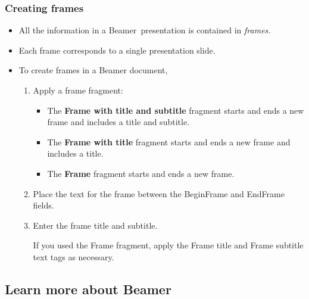\documentclass[notes=show]{beamer}%
\newenvironment{stepenumerate}{\begin{enumerate}[<+->]}{\end{enumerate}}
\newenvironment{stepitemize}{\begin{itemize}[<+->]}{\end{itemize} }
\begin{document}
\begin{frame}%
%

\frametitle{Creating frames}%


\begin{stepitemize}
\item All the information in a Beamer\emph{\ }presentation is contained in
\textit{frames.}

\item Each frame corresponds to a single presentation slide.

\item To create frames in a Beamer document,

\begin{stepenumerate}
\item Apply a frame fragment:

\begin{stepitemize}
\item The \textbf{Frame with title and subtitle} fragment starts and ends a
new frame and includes a title and subtitle.

\item The \textbf{Frame with title }fragment starts and ends a new frame and
includes a title.

\item The \textbf{Frame} fragment starts and ends a new frame.
\end{stepitemize}

\item Place the text for the frame between the BeginFrame and EndFrame fields.

\item Enter the frame title and subtitle.

If you used the Frame fragment, apply the Frame title and Frame subtitle text
tags as necessary.
\end{stepenumerate}
\end{stepitemize}%

\end{frame}%


\subsection{Learn more about Beamer}%
\end{document}
